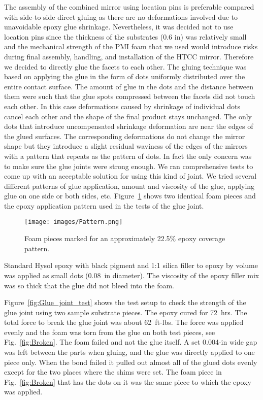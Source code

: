 The assembly of the combined mirror using location pins is preferable compared with side-to side direct gluing
as there are no deformations involved due to unavoidable epoxy glue shrinkage. Nevertheless, it was decided
not to use location pins since the thickness of the substrates (0.6 in) was relatively small and the mechanical
strength of the PMI foam that we used would introduce risks during final assembly, handling, and installation of
the HTCC mirror. Therefore we decided to directly glue the facets to each other. The gluing technique was
based on applying the glue in the form of dots uniformly distributed over the entire contact surface. The
amount of glue in the dots and the distance between them were such that the glue spots compressed between
the facets did not touch each other. In this case deformations caused by shrinkage of individual dots cancel
each other and the shape of the final product stays unchanged. The only dots that introduce uncompensated
shrinkage deformation are near the edges of the glued surfaces. The corresponding deformations do not change
the mirror shape but they introduce a slight residual waviness of the edges of the mirrors with a pattern that
repeats as the pattern of dots. In fact the only concern was to make sure the glue joints were strong enough.
We ran comprehensive tests to come up with an acceptable solution for using this kind of joint. We tried several
different patterns of glue application, amount and viscosity of the glue, applying glue on one side or both sides,
etc. Figure~\ref{fig:Pattern} shows two identical foam pieces and the epoxy application pattern used in the
tests of the glue joint. 

\begin{figure}[ht]
    \centering
    \texttt{[image: images/Pattern.png]}
    \caption{Foam pieces marked for an approximately 22.5\% epoxy coverage pattern.}
    \label{fig:Pattern}
\end{figure}

Standard Hysol epoxy with black pigment and 1:1 silica filler to epoxy by volume was applied as small dots
(0.08~in diameter). The viscosity of the epoxy filler mix was so thick that the glue did not bleed into the foam. 

Figure~\ref{fig:Glue_joint_test} shows the test setup to check the strength of the glue joint using two sample
substrate pieces. The epoxy cured for 72~hrs. The total force to break the glue joint was about 62~ft-lbs. The
force was applied evenly and the foam was torn from the glue on both test pieces, see Fig.~\ref{fig:Broken}. The
foam failed and not the glue itself. A set 0.004-in wide gap was left between the parts when gluing, and the glue
was directly applied to one piece only. When the bond failed it pulled out almost all of the glued dots evenly except
for the two places where the shims were set. The foam piece in Fig.~\ref{fig:Broken} that has the dots on it was
the same piece to which the epoxy was applied.

